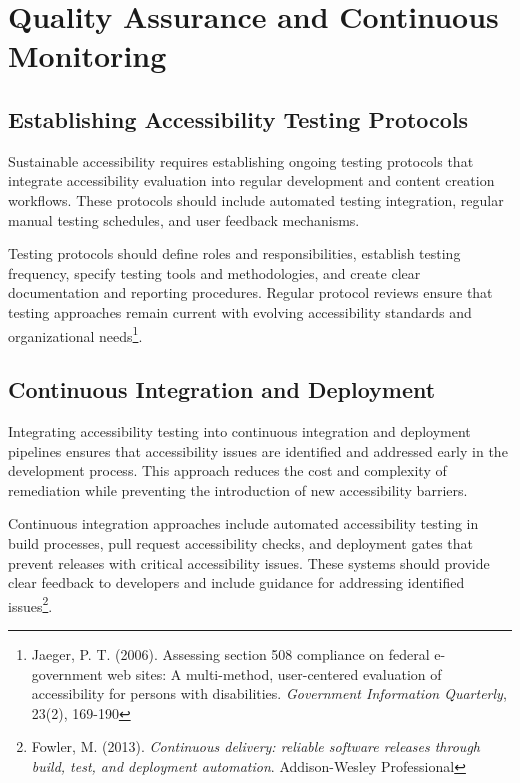 \section{Quality Assurance and Continuous Monitoring}\label{sec:qa-monitoring}

\subsection{Establishing Accessibility Testing Protocols}

Sustainable accessibility requires establishing ongoing testing protocols that integrate accessibility evaluation into regular development and content creation workflows. These protocols should include automated testing integration, regular manual testing schedules, and user feedback mechanisms.

Testing protocols should define roles and responsibilities, establish testing frequency, specify testing tools and methodologies, and create clear documentation and reporting procedures. Regular protocol reviews ensure that testing approaches remain current with evolving accessibility standards and organizational needs\footnote{Jaeger, P. T. (2006). Assessing section 508 compliance on federal e-government web sites: A multi-method, user-centered evaluation of accessibility for persons with disabilities. \textit{Government Information Quarterly}, 23(2), 169-190}.

\subsection{Continuous Integration and Deployment}

Integrating accessibility testing into continuous integration and deployment pipelines ensures that accessibility issues are identified and addressed early in the development process. This approach reduces the cost and complexity of remediation while preventing the introduction of new accessibility barriers.

Continuous integration approaches include automated accessibility testing in build processes, pull request accessibility checks, and deployment gates that prevent releases with critical accessibility issues. These systems should provide clear feedback to developers and include guidance for addressing identified issues\footnote{Fowler, M. (2013). \textit{Continuous delivery: reliable software releases through build, test, and deployment automation}. Addison-Wesley Professional}.

